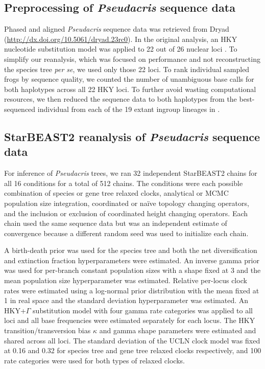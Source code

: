 \documentclass[12pt]{article}
\begin{document}
\subsection{Preprocessing of \textit{Pseudacris} sequence data}

Phased and aligned \textit{Pseudacris} sequence data was retrieved from Dryad
(\url{http://dx.doi.org/10.5061/dryad.23rc0}). In the original analysis, an HKY nucleotide substitution
model was applied to 22 out of 26 nuclear loci \citep{Barrow201478}. To simplify
our reanalysis, which was focused on performance and not reconstructing the
species tree \textit{per se}, we used only those 22 loci. To rank
individual sampled frogs by sequence quality, we counted the number of unambiguous base
calls for both haplotypes across all 22 HKY loci. To further avoid wasting
computational resources, we then reduced the sequence data to both haplotypes
from the best-sequenced individual from each of the 19 extant ingroup lineages
in \cite{Barrow201478}.

\subsection{StarBEAST2 reanalysis of \textit{Pseudacris} sequence data}

For inference of \textit{Pseudacris} trees, we ran 32 independent StarBEAST2
chains for all 16 conditions for a total of 512 chains. The conditions were each
possible combination of species or gene tree relaxed clocks, analytical or
MCMC population size integration, coordinated or na\"ive topology changing
operators, and the inclusion or exclusion of coordinated height changing
operators. Each chain used the same sequence data but was an independent
estimate of convergence because a different random seed was used to initialize
each chain.

A birth-death prior was used for the species tree and both the net
diversification and extinction fraction hyperparameters were estimated. An
inverse gamma prior was used for per-branch constant population sizes with a
shape fixed at 3 and the mean population size hyperparameter was estimated.
Relative per-locus clock rates were estimated using a log-normal prior
distribution with the mean fixed at 1 in real space and the standard deviation
hyperparameter was estimated. An HKY+$\Gamma$ substitution model with four gamma
rate categories was applied to all loci and all base frequencies were estimated
separately for each locus. The HKY transition/transversion bias $\kappa$ and
gamma shape parameters were estimated and shared across all loci. The standard
deviation of the UCLN clock model was fixed at 0.16 and 0.32 for species tree
and gene tree relaxed clocks respectively, and 100 rate categories were used for
both types of relaxed clocks.
\end{document}

